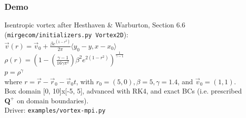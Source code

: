 %
\begin{frame}\frametitle{Demo}
Isentropic vortex after Hesthaven \& Warburton, Section 6.6 (\texttt{mirgecom/initializers.py Vortex2D}):\\
\vspace{.2in}
$\vec{v}(r) = \vec{v}_0 + \frac{\beta{e}^{(1 - r^2)}}{2\pi}\langle{y}_0 - y,x - x_0\rangle$\\
$\rho(r) = ( 1 - (\frac{\gamma-1}{16\gamma\pi^{2}})\beta^{2}{e}^{2(1-r^{2})})^{\frac{1}{\gamma-1}}$\\
$p = \rho^{\gamma}$\\
where $r = \vec{r} - \vec{r}_0 - \vec{v}_0{t}$, with $r_0 = (5, 0), \beta=5, \gamma=1.4$, and $\vec{v}_0 = (1,1)$.\\
\vspace{.2in}
Box domain [0, 10]x[-5, 5], advanced with RK4, and exact BCs (i.e. prescribed $\mathbf{Q}^{+}$ on domain boundaries).\\
\vspace{.2in}
Driver: \texttt{examples/vortex-mpi.py}
\end{frame}

